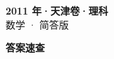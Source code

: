 \documentclass[zihao=-4, a4paper]{ctexart}
\begin{document}
\begin{center}
  {\Large\bfseries 2011 年·天津卷·理科}\\[4pt]
  {\large 数学 · 简答版}
\end{center}
\medskip
{}

\clearpage
{}
\begin{center}{\Large\bfseries 答案速查}\end{center}
\medskip

\end{document}
